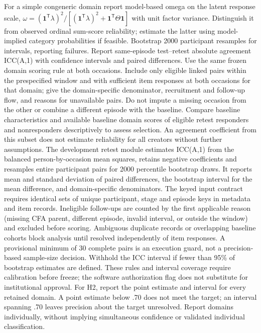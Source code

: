 For a simple congeneric domain report model-based omega on the latent response scale, $\omega=(\mathbf{1}^{\mathsf T}\lambda)^2/[(\mathbf{1}^{\mathsf T}\lambda)^2+\mathbf{1}^{\mathsf T}\Theta\mathbf{1}]$ with unit factor variance. Distinguish it from observed ordinal sum-score reliability; estimate the latter using model-implied category probabilities if feasible. Bootstrap 2000 participant resamples for intervals, reporting failures. Report same-episode test--retest absolute agreement ICC(A,1) with confidence intervals and paired differences. Use the same frozen domain scoring rule at both occasions. Include only eligible linked pairs within the prespecified window and with sufficient item responses at both occasions for that domain; give the domain-specific denominator, recruitment and follow-up flow, and reasons for unavailable pairs. Do not impute a missing occasion from the other or combine a different episode with the baseline. Compare baseline characteristics and available baseline domain scores of eligible retest responders and nonresponders descriptively to assess selection. An agreement coefficient from this subset does not estimate reliability for all creators without further assumptions. The development retest module estimates ICC(A,1) from the balanced person-by-occasion mean squares, retains negative coefficients and resamples entire participant pairs for 2000 percentile bootstrap draws. It reports mean and standard deviation of paired differences, the bootstrap interval for the mean difference, and domain-specific denominators. The keyed input contract requires identical sets of unique participant, stage and episode keys in metadata and item records. Ineligible follow-ups are counted by the first applicable reason (missing CFA parent, different episode, invalid interval, or outside the window) and excluded before scoring. Ambiguous duplicate records or overlapping baseline cohorts block analysis until resolved independently of item responses. A provisional minimum of 30 complete pairs is an execution guard, not a precision-based sample-size decision. Withhold the ICC interval if fewer than 95\% of bootstrap estimates are defined. These rules and interval coverage require calibration before freeze; the software authorization flag does not substitute for institutional approval. For H2, report the point estimate and interval for every retained domain. A point estimate below .70 does not meet the target; an interval spanning .70 leaves precision about the target unresolved. Report domains individually, without implying simultaneous confidence or validated individual classification.

